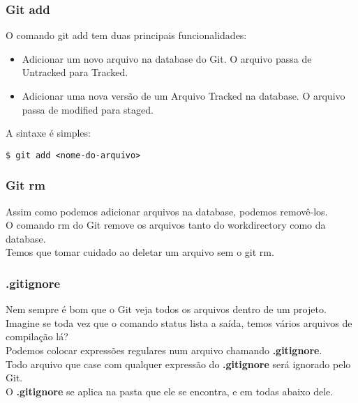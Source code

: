 \documentclass[brazil]{beamer}
\begin{document}
\begin{frame}[fragile]
  \frametitle{Git add}
  O comando git add tem duas principais funcionalidades:
  \begin{itemize}
    \item Adicionar um novo arquivo na database do Git. O arquivo passa de Untracked para Tracked.
    \item Adicionar uma nova versão de um Arquivo Tracked na database. O arquivo passa de modified para staged.
  \end{itemize}
  A sintaxe é simples:
  \begin{block}{}
    \verb#$ git add <nome-do-arquivo>#
  \end{block}
\end{frame}

\begin{frame}[fragile]
  \frametitle{Git rm}
  Assim como podemos adicionar arquivos na database, podemos removê-los. \\
  \pause
  O comando rm do Git remove os arquivos tanto do workdirectory como da database. \\
  \pause
  Temos que tomar cuidado ao deletar um arquivo sem o git rm.
\end{frame}

\begin{frame}[fragile]
  \frametitle{.gitignore}
  Nem sempre é bom que o Git veja todos os arquivos dentro de um projeto. \\
  \pause
  Imagine se toda vez que o comando status lista a saída, temos vários arquivos de compilação lá? \\
  \pause
  Podemos colocar expressões regulares num arquivo chamando \textbf{.gitignore}. \\
  \pause
  Todo arquivo que case com qualquer expressão do \textbf{.gitignore} será ignorado pelo Git. \\
  \pause
  O \textbf{.gitignore} se aplica na pasta que ele se encontra, e em todas abaixo dele. 
\end{frame}
\end{document}
